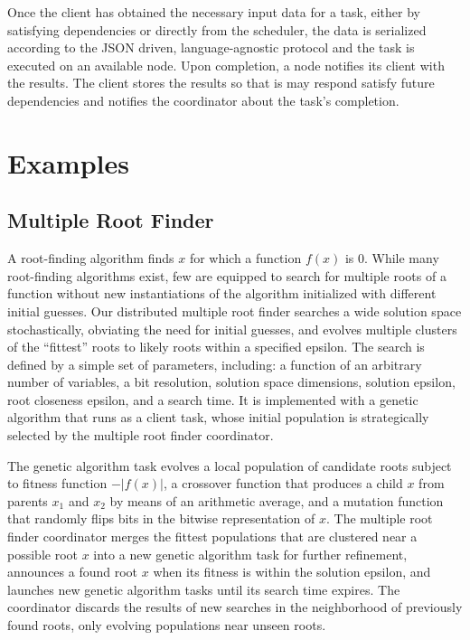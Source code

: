 \documentclass [11pt, twocolumn] {article}
\begin{document}
Once the client has obtained the necessary input data for a task, either by satisfying dependencies or directly from the scheduler, the data is serialized according to the JSON driven, language-agnostic protocol and the task is executed on an available node. Upon completion, a node notifies its client with the results. The client stores the results so that is may respond satisfy future dependencies and notifies the coordinator about the task's completion.

\section {Examples}

\subsection {Multiple Root Finder} 

\newcommand{\abs}[1]{\lvert{#1}\rvert}

A root-finding algorithm finds $x$ for which a function $f(x)$ is 0. While many root-finding algorithms exist, few are equipped to search for multiple roots of a function without new instantiations of the algorithm initialized with different initial guesses. Our distributed multiple root finder searches a wide solution space stochastically, obviating the need for initial guesses, and evolves multiple clusters of the ``fittest'' roots to likely roots within a specified epsilon. The search is defined by a simple set of parameters, including: a function of an arbitrary number of variables, a bit resolution, solution space dimensions, solution epsilon, root closeness epsilon, and a search time. It is implemented with a genetic algorithm that runs as a client task, whose initial population is strategically selected by the multiple root finder coordinator.

The genetic algorithm task evolves a local population of candidate roots subject to fitness function $-\abs{f(x)}$, a crossover function that produces a child $x$ from parents $x_1$ and $x_2$ by means of an arithmetic average, and a mutation function that randomly flips bits in the bitwise representation of $x$. The multiple root finder coordinator merges the fittest populations that are clustered near a possible root $x$ into a new genetic algorithm task for further refinement, announces a found root $x$ when its fitness is within the solution epsilon, and launches new genetic algorithm tasks until its search time expires. The coordinator discards the results of new searches in the neighborhood of previously found roots, only evolving populations near unseen roots.
\end{document}
